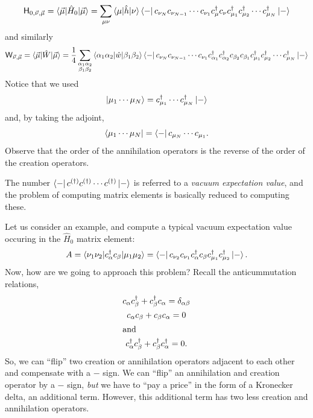 \documentclass{report}
\theoremstyle{plain}
\theoremstyle{definition}
\begin{document}
\begin{equation}
  \mathsf{H}_{0,\vec{\nu},\vec{\mu}} =
  \braket{\vec{\mu}|\hat{H}_0|\vec{\mu}} = \sum_{\mu\nu}
  \braket{\mu|\hat{h}|\nu} \bra{-} c_{\nu_N} c_{\nu_{N-1}} \cdots
  c_{\nu_1} c^\dag_\mu c_\nu c^\dag_{\mu_1} c^\dag_{\mu_2}\cdots
  c^\dag_{\mu_N} \ket{-}
\end{equation}
and similarly
\begin{equation}
  \mathsf{W}_{\vec{\nu},\vec{\mu}} =
  \braket{\vec{\mu}|\hat{W}|\vec{\mu}} = \frac{1}{4}
  \sum_{\substack{\alpha_1\alpha_2\\\beta_1\beta_2}} 
  \braket{\alpha_1\alpha_2|\hat{w}|\beta_1\beta_2} \bra{-} c_{\nu_N} c_{\nu_{N-1}} \cdots  c_{\nu_1} c^\dag_{\alpha_1} c^\dag_{\alpha_2} c_{\beta_2} c_{\beta_1} c^\dag_{\mu_1} c^\dag_{\mu_2}\cdots  c^\dag_{\mu_N} \ket{-}
\end{equation}
Notice that we used
\begin{equation}
  \ket{\mu_1\cdots\mu_N} = c^\dag_{\mu_1}\cdots c^\dag_{\mu_N}\ket{-}
\end{equation}
and, by taking the adjoint,
\begin{equation}
  \bra{\mu_1\cdots\mu_N} = \bra{-} c_{\mu_N} \cdots c_{\mu_1}.
\end{equation}
Observe that the order of the annihilation operators is the reverse of
the order of the creation operators.

The number $\bra{-} c^{(\dag)} c^{(\dag)} \cdots c^{(\dag)}\ket{-}$ is
referred to a \emph{vacuum expectation value}, and the problem of
computing matrix elements is basically reduced to computing these.

Let us consider an example, and compute a typical vacuum expectation
value occuring in the $\hat{H}_0$ matrix element:
\begin{equation}
  A = \braket{\nu_1\nu_2|c^\dag_\alpha c_\beta|\mu_1\mu_2} =
  \bra{-}c_{\nu_2} c_{\nu_1} c^\dag_\alpha c_\beta c^\dag_{\mu_1}
  c^\dag_{\mu_2} \ket{-}.
\end{equation}
Now, how are we going to approach this problem? Recall the
anticummutation relations,
\begin{gather}
  c_\alpha c^\dag_\beta + c^\dag_\beta c_\alpha = \delta_{\alpha\beta}\\
  c_\alpha c_\beta + c_\beta c_\alpha = 0\\\intertext{and}
  c^\dag_\alpha c^\dag_\beta + c^\dag_\beta c^\dag_\alpha = 0.
\end{gather}
So, we can ``flip'' two creation or annihilation operators adjacent to
each other and compensate with a $-$ sign. We can ``flip'' an
annihilation and creation operator by a $-$ sign, \emph{but} we have
to ``pay a price'' in the form of a Kronecker delta, an additional
term. However, this additional term has two less creation and
annihilation operators.
\end{document}
